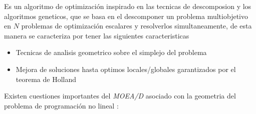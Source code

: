 \documentclass[letterpaper,10pt]{article}
\begin{document}
Es un algoritmo de optimización inspirado en las tecnicas de descomposion y los algoritmos geneticos, que se basa en el descomponer un problema multiobjetivo en $N$ problemas de optimización escalares y resolverlos simultaneamente, de esta manera se caracteriza por tener las siguientes caracteristicas
 \begin{itemize}
 \item Tecnicas de analisis geometrico sobre el simplejo del problema \cite{mie99,Das:1998:NIN:588907.589322, Messac2003}
 \item Mejora de soluciones hasta optimos locales/globales garantizados por el teorema de Holland\cite{Holland:1992:ANA:531075}
 \end{itemize}
 
Existen cuestiones importantes del \emph{MOEA/D} asociado con la geometria del problema de programación no lineal \cite{4358754}:
\end{document}
